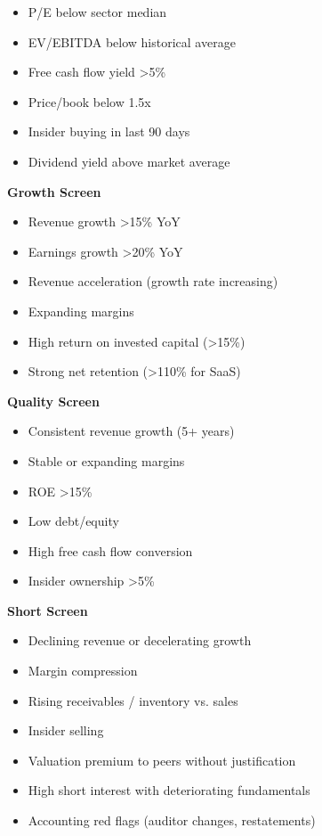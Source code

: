 \documentclass[11pt]{article}
\begin{document}
\begin{itemize}[leftmargin=*,itemsep=2pt,topsep=2pt]
\item {} P/E below sector median
\item {} EV/EBITDA below historical average
\item {} Free cash flow yield >5\%
\item {} Price/book below 1.5x
\item {} Insider buying in last 90 days
\item {} Dividend yield above market average
\end{itemize}

\textbf{Growth Screen}

\begin{itemize}[leftmargin=*,itemsep=2pt,topsep=2pt]
\item {} Revenue growth >15\% YoY
\item {} Earnings growth >20\% YoY
\item {} Revenue acceleration (growth rate increasing)
\item {} Expanding margins
\item {} High return on invested capital (>15\%)
\item {} Strong net retention (>110\% for SaaS)
\end{itemize}

\textbf{Quality Screen}

\begin{itemize}[leftmargin=*,itemsep=2pt,topsep=2pt]
\item {} Consistent revenue growth (5+ years)
\item {} Stable or expanding margins
\item {} ROE >15\%
\item {} Low debt/equity
\item {} High free cash flow conversion
\item {} Insider ownership >5\%
\end{itemize}

\textbf{Short Screen}

\begin{itemize}[leftmargin=*,itemsep=2pt,topsep=2pt]
\item {} Declining revenue or decelerating growth
\item {} Margin compression
\item {} Rising receivables / inventory vs. sales
\item {} Insider selling
\item {} Valuation premium to peers without justification
\item {} High short interest with deteriorating fundamentals
\item {} Accounting red flags (auditor changes, restatements)
\end{itemize}
\end{document}
